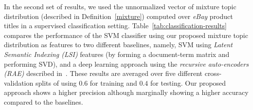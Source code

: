 \documentclass{article} %
\begin{document}
In the second set of results, we used the unnormalized vector of mixture topic
distribution (described in Definition~\ref{mixture}) computed over {\em eBay} product titles in a supervised classification setting. Table~\ref{tab:classification-results} compares the performance of the SVM classifier using our proposed mixture topic distribution as features to two different baselines, namely, SVM using {\em Latent Semantic Indexing (LSI)} features (by forming a document-term matrix and performing SVD), and a deep learning approach using the {\em recursive auto-encoders (RAE)} described in~\cite{Socher:2011:SRA:2145432.2145450}. These results are averaged over five different cross-validation splits of using $0.6$ for training and $0.4$ for testing. Our proposed approach shows a higher precision although marginally showing a higher accuracy compared to the baselines.
\end{document}
